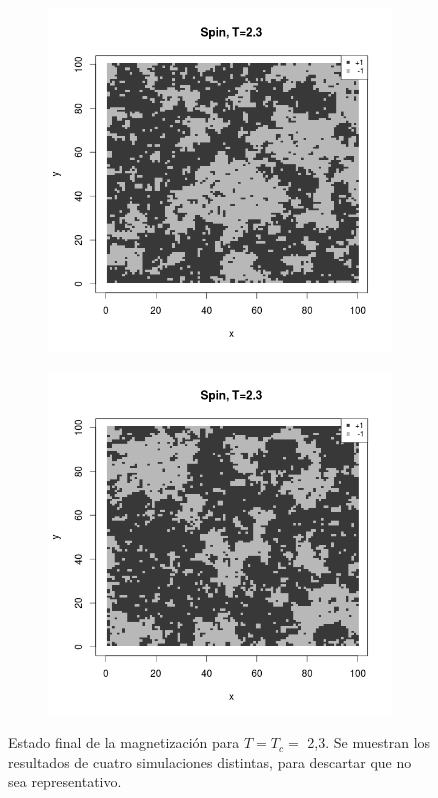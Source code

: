 \documentclass{scrartcl}
\begin{document}
\begin{figure}[ht]
\begin{subfigure}{.5\textwidth}
\end{subfigure}
\begin{subfigure}{.5\textwidth}
  \centering
  \includegraphics[width=1\linewidth]{spins/spinT2_3_3}
\end{subfigure}%
\begin{subfigure}{.5\textwidth}
  \centering
  \includegraphics[width=1\linewidth]{spins/spinT2_3_4}
\end{subfigure}
\caption{Estado final de la magnetización para $T=T_c=$ 2,3. Se muestran los resultados de cuatro simulaciones distintas, para descartar que no sea representativo.}
\label{fig:spinsTc}
\end{figure}
\end{document}
